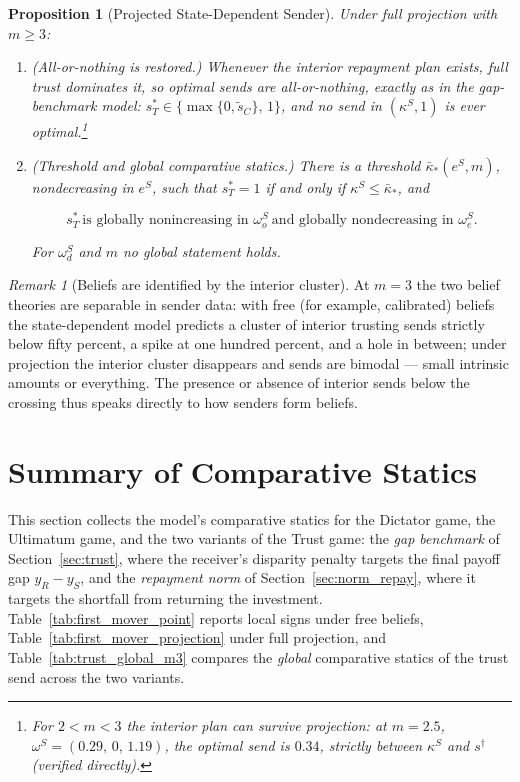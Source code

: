 \documentclass[11pt]{article}
\theoremstyle{plain}
\newtheorem{proposition}{Proposition}
\theoremstyle{remark}
\newtheorem{remark}{Remark}
\begin{document}
\begin{proposition}[Projected State-Dependent Sender]
\label{prop:norm3_projection}
Under full projection with $m\ge3$:
\begin{enumerate}[topsep=2pt,itemsep=2pt]
\item \emph{(All-or-nothing is restored.)}  Whenever the interior repayment plan exists, full trust dominates it, so optimal sends are all-or-nothing, exactly as in the gap-benchmark model: $s_T^\ast\in\{\max\{0,\tilde s_C\},\,1\}$, and no send in $(\kappa^S,1)$ is ever optimal.\footnote{For $2<m<3$ the interior plan can survive projection: at $m=2.5$, $\omega^S=(0.29,\,0,\,1.19)$, the optimal send is $0.34$, strictly between $\kappa^S$ and $s^\dagger$ (verified directly).}
\item \emph{(Threshold and global comparative statics.)}  There is a threshold $\bar\kappa_\ast(e^S,m)$, nondecreasing in $e^S$, such that $s_T^\ast=1$ if and only if $\kappa^S\le\bar\kappa_\ast$, and
\begin{csbox}
\[
        s_T^\ast\ \text{is globally nonincreasing in }\omega_o^S\ \text{and globally nondecreasing in }\omega_e^S.
\]
\end{csbox}
For $\omega_d^S$ and $m$ no global statement holds.
\end{enumerate}
\end{proposition}

\begin{remark}[Beliefs are identified by the interior cluster]
At $m=3$ the two belief theories are separable in sender data: with free (for example, calibrated) beliefs the state-dependent model predicts a cluster of interior trusting sends strictly below fifty percent, a spike at one hundred percent, and a hole in between; under projection the interior cluster disappears and sends are bimodal --- small intrinsic amounts or everything.  The presence or absence of interior sends below the crossing thus speaks directly to how senders form beliefs.
\end{remark}
\fi



\section{Summary of Comparative Statics}
\label{sec:summary}

This section collects the model's comparative statics for the Dictator game, the Ultimatum game, and the two variants of the Trust game: the \emph{gap benchmark} of Section~\ref{sec:trust}, where the receiver's disparity penalty targets the final payoff gap $y_R-y_S$, and the \emph{repayment norm} of Section~\ref{sec:norm_repay}, where it targets the shortfall from returning the investment.  Table~\ref{tab:first_mover_point} reports local signs under free beliefs, Table~\ref{tab:first_mover_projection} under full projection, and Table~\ref{tab:trust_global_m3} compares the \emph{global} comparative statics of the trust send across the two variants.
\end{document}
